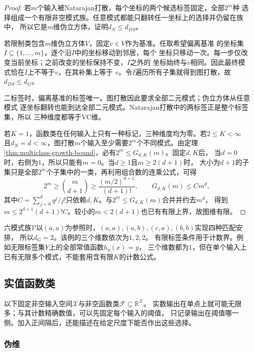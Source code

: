 \begin{proof}
若\(m\)个输入被Natarajan打散，每个坐标的两个候选标签固定，全部\(2^m\)种
选择组成一个有限非空模式族。任意模式都能只翻转任一坐标上的选择并仍留在族中，
所以它是\(m\)维伪立方体，证明\(d_N\leq d_{DS}\)。

若限制类包含\(m\)维伪立方体\(V\)，固定\(v\in V\)作为基准。任取希望偏离基准
的坐标集\(I\subseteq\{1,\ldots,m\}\)，逐个沿\(I\)中的坐标移动到邻居，每个
坐标只移动一次。每一步仅改变当前坐标；之前改变的坐标保持不变，\(I\)之外的
坐标始终与\(v\)相同。因此最终模式恰在\(I\)上不等于\(v\)，在其补集上等于
\(v\)。令\(I\)遍历所有子集就得到图打散，故\(d_{DS}\leq d_G\)。

二标签时，偏离基准的标签唯一。图打散因此要求全部二元模式；伪立方体从任意模式
逐坐标翻转也能到达全部二元模式。Natarajan打散中的两标签正是整个标签集，所以
三种维度都等于VC维。

若\(K=1\)，函数类在任何输入上只有一种标记，三种维度均为零。若\(2\leq K<\infty\)
且\(d_N=d<\infty\)，图打散\(m\)个输入至少需要\(2^m\)个不同模式。由定理~
\ref{thm:multiclass-growth-bound}，必有\(2^m\leq G_{d,K}(m)\)。固定\(d,K\)后，
当$d=0$时，右侧为$1$，所以只能有$m=0$。当$d\geq1$且$m\geq2(d+1)$时，
大小为$d+1$的子集只是全部$2^m$个子集中的一类，再利用组合数的连乘公式，可得
\[
 2^m\geq\binom m{d+1}\geq\frac{(m/2)^{d+1}}{(d+1)!},
 \qquad
 G_{d,K}(m)\leq C m^d,
\]
其中$C=\sum_{j=0}^d q^j/j!$只依赖$d,K$。与$2^m\leq G_{d,K}(m)$合并并约去$m^d$，
得到$m\leq2^{d+1}(d+1)!C$。较小的$m<2(d+1)$也已有有限上界，故图维有限。
\end{proof}

六模式族$\mathcal V$以$(a,a)$为参照时，$(a,a),(a,b),(c,a),(b,b)$实现四种匹配安排，
所以$d_G=2$。该例的三个维数依次为$1,2,2$。
有限标签条件用于计数界。例如无限标签集$Y$上的全部常值函数$h_y(x)=y$，
三个维数都为$1$，但在单个输入上已有无限多个模式，不能套用含有限$K$的计数公式。

\subsection{实值函数类}
\label{sec:comb-real-valued-threshold-margins}

以下固定非空输入空间$\mathcal X$与非空函数类$\mathcal F\subseteq\mathbb R^{\mathcal X}$。
实数输出在单点上就可能无限多；与其计数精确数值，可以先固定每个输入的阈值，
只记录输出在阈值哪一侧。加入正间隔后，还能描述在给定尺度下能否作出这些选择。

\subsubsection{伪维}
\label{sec:comb-threshold-patterns}

